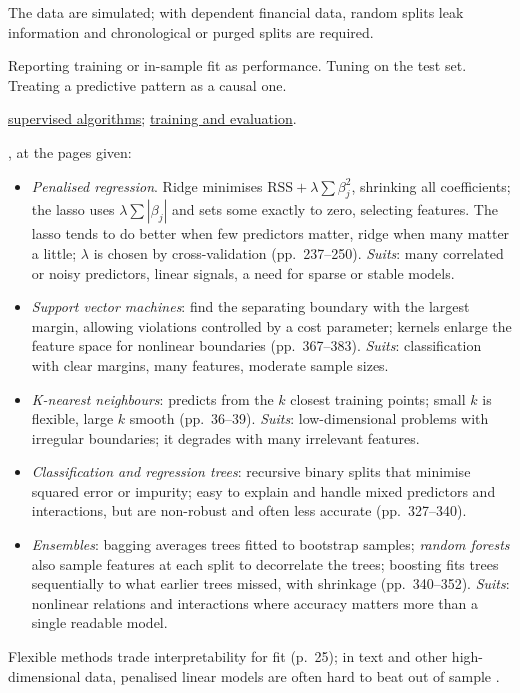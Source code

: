 \begin{qfdefinition}
 The data are simulated; with dependent financial data, random splits leak information and chronological or purged splits are required.

 Reporting training or in-sample fit as performance. Tuning on the test set. Treating a predictive pattern as a causal one.

 \hyperref[meth:supervised-algorithm-selection]{supervised algorithms}; \hyperref[meth:ml-model-training-evaluation]{training and evaluation}.

\end{qfdefinition}

\begin{qfmethod}\label{meth:supervised-algorithm-selection}
 \citep[pp.~25--39, 237--250, 327--383]{s6-isl}, at the pages given:
\begin{itemize}
\item \emph{Penalised regression}. Ridge minimises $\mathrm{RSS}+\lambda\sum\beta_j^2$, shrinking all coefficients; the lasso uses $\lambda\sum|\beta_j|$ and sets some exactly to zero, selecting features. The lasso tends to do better when few predictors matter, ridge when many matter a little; $\lambda$ is chosen by cross-validation (pp.~237--250). \emph{Suits}: many correlated or noisy predictors, linear signals, a need for sparse or stable models.
\item \emph{Support vector machines}: find the separating boundary with the largest margin, allowing violations controlled by a cost parameter; kernels enlarge the feature space for nonlinear boundaries (pp.~367--383). \emph{Suits}: classification with clear margins, many features, moderate sample sizes.
\item \emph{K-nearest neighbours}: predicts from the $k$ closest training points; small $k$ is flexible, large $k$ smooth (pp.~36--39). \emph{Suits}: low-dimensional problems with irregular boundaries; it degrades with many irrelevant features.
\item \emph{Classification and regression trees}: recursive binary splits that minimise squared error or impurity; easy to explain and handle mixed predictors and interactions, but are non-robust and often less accurate (pp.~327--340).
\item \emph{Ensembles}: bagging averages trees fitted to bootstrap samples; \emph{random forests} also sample features at each split to decorrelate the trees; boosting fits trees sequentially to what earlier trees missed, with shrinkage (pp.~340--352). \emph{Suits}: nonlinear relations and interactions where accuracy matters more than a single readable model.
\end{itemize}
Flexible methods trade interpretability for fit (p.~25); in text and other high-dimensional data, penalised linear models are often hard to beat out of sample \citep[NBER WP 23276, pp.~12--15]{wide-gentzkow-kelly-taddy}.


\end{qfmethod}
